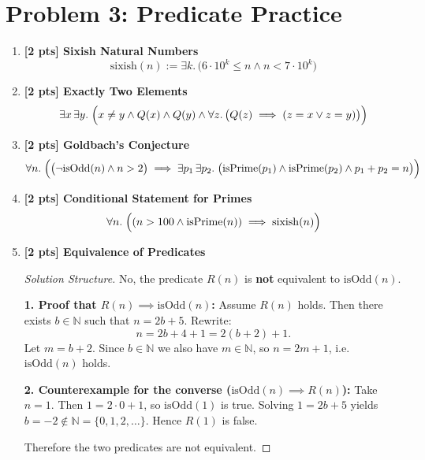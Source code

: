 \documentclass[11pt]{article}
\begin{document}
\section*{Problem 3: Predicate Practice}
\begin{enumerate}
    \item[(a)] \textbf{[2 pts] Sixish Natural Numbers}
    \begin{equation*}
        \text{sixish}(n) := \exists k.\, \bigl(6 \cdot 10^k \le n \land n < 7 \cdot 10^k\bigr)
    \end{equation*}

    \item[(b)] \textbf{[2 pts] Exactly Two Elements}
    \begin{equation*}
        \exists x\,\exists y.\; 
        \Bigl( x \neq y \land Q(x) \land Q(y) 
        \land \forall z.\, \bigl( Q(z) \implies (z = x \lor z = y) \bigr) \Bigr)
    \end{equation*}

    \item[(c)] \textbf{[2 pts] Goldbach's Conjecture}
    \begin{equation*}
        \forall n.\; 
        \Bigl( 
            \bigl(\neg\mathrm{isOdd}(n) \land n > 2\bigr) 
            \implies 
            \exists p_1\,\exists p_2.\;
            \bigl(\mathrm{isPrime}(p_1) \land \mathrm{isPrime}(p_2) \land p_1 + p_2 = n\bigr)
        \Bigr)
    \end{equation*}

    \item[(d)] \textbf{[2 pts] Conditional Statement for Primes}
    \begin{equation*}
        \forall n.\; 
        \Bigl( (n > 100 \land \mathrm{isPrime}(n)) \implies \mathrm{sixish}(n) \Bigr)
    \end{equation*}

    \item[(e)] \textbf{[2 pts] Equivalence of Predicates}
    \begin{proof}[Solution Structure]
    No, the predicate $R(n)$ is \textbf{not} equivalent to $\mathrm{isOdd}(n)$.
    
    \textbf{1. Proof that $R(n) \implies \mathrm{isOdd}(n)$:}  
    Assume $R(n)$ holds. Then there exists $b \in \mathbb{N}$ such that $n = 2b + 5$.  
    Rewrite:
    \[
        n = 2b + 4 + 1 = 2(b + 2) + 1.
    \]
    Let $m = b + 2$. Since $b \in \mathbb{N}$ we also have $m \in \mathbb{N}$, so 
    $n = 2m + 1$, i.e.\ $\mathrm{isOdd}(n)$ holds.
    
    \textbf{2. Counterexample for the converse ($\mathrm{isOdd}(n) \implies R(n)$):}  
    Take $n = 1$. Then $1 = 2\cdot 0 + 1$, so $\mathrm{isOdd}(1)$ is true.  
    Solving $1 = 2b + 5$ yields $b = -2 \notin \mathbb{N} = \{0,1,2,\dots\}$.  
    Hence $R(1)$ is false.
    
    Therefore the two predicates are not equivalent.
    \end{proof}
\end{enumerate}
\end{document}
